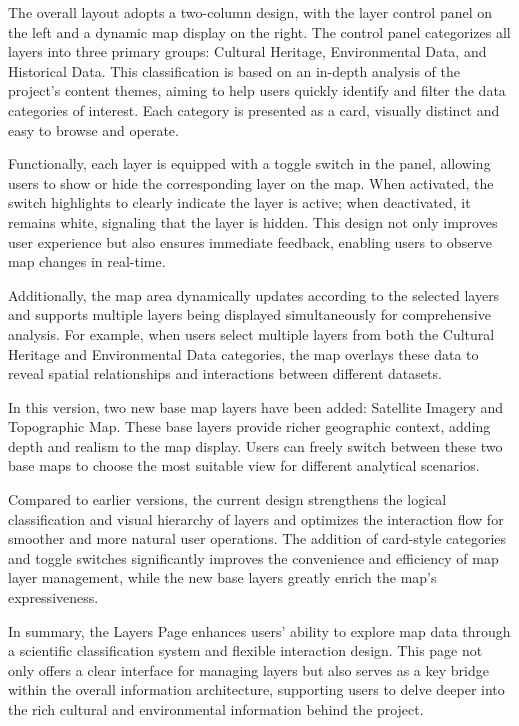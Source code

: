 The overall layout adopts a two-column design, with the layer control panel on the left and a dynamic map display on the right. The control panel categorizes all layers into three primary groups: Cultural Heritage, Environmental Data, and Historical Data. This classification is based on an in-depth analysis of the project’s content themes, aiming to help users quickly identify and filter the data categories of interest. Each category is presented as a card, visually distinct and easy to browse and operate.

Functionally, each layer is equipped with a toggle switch in the panel, allowing users to show or hide the corresponding layer on the map. When activated, the switch highlights to clearly indicate the layer is active; when deactivated, it remains white, signaling that the layer is hidden. This design not only improves user experience but also ensures immediate feedback, enabling users to observe map changes in real-time.

Additionally, the map area dynamically updates according to the selected layers and supports multiple layers being displayed simultaneously for comprehensive analysis. For example, when users select multiple layers from both the Cultural Heritage and Environmental Data categories, the map overlays these data to reveal spatial relationships and interactions between different datasets.

In this version, two new base map layers have been added: Satellite Imagery and Topographic Map. These base layers provide richer geographic context, adding depth and realism to the map display. Users can freely switch between these two base maps to choose the most suitable view for different analytical scenarios.

Compared to earlier versions, the current design strengthens the logical classification and visual hierarchy of layers and optimizes the interaction flow for smoother and more natural user operations. The addition of card-style categories and toggle switches significantly improves the convenience and efficiency of map layer management, while the new base layers greatly enrich the map’s expressiveness.

In summary, the Layers Page enhances users’ ability to explore map data through a scientific classification system and flexible interaction design. This page not only offers a clear interface for managing layers but also serves as a key bridge within the overall information architecture, supporting users to delve deeper into the rich cultural and environmental information behind the project.


